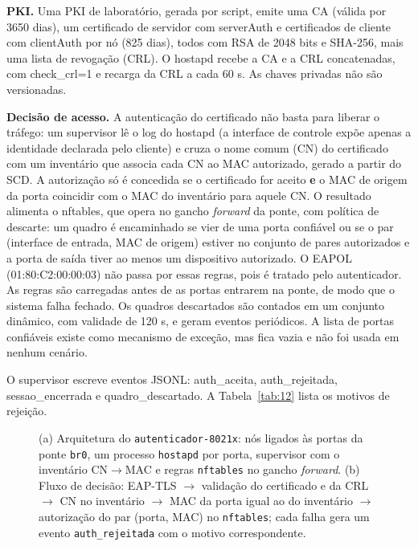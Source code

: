 \documentclass[12pt]{article}
\begin{document}
\textbf{PKI.} Uma PKI de laboratório, gerada por script, emite uma CA (válida por 3650 dias), um certificado de servidor com serverAuth e certificados de cliente com clientAuth por nó (825 dias), todos com RSA de 2048 bits e SHA-256, mais uma lista de revogação (CRL). O hostapd recebe a CA e a CRL concatenadas, com check\_\allowbreak{}crl=1 e recarga da CRL a cada 60 s. As chaves privadas não são versionadas.

\textbf{Decisão de acesso.} A autenticação do certificado não basta para liberar o tráfego: um supervisor lê o log do hostapd (a interface de controle expõe apenas a identidade declarada pelo cliente) e cruza o nome comum (CN) do certificado com um inventário que associa cada CN ao MAC autorizado, gerado a partir do SCD. A autorização só é concedida se o certificado for aceito \textbf{e} o MAC de origem da porta coincidir com o MAC do inventário para aquele CN. O resultado alimenta o nftables, que opera no gancho \emph{forward} da ponte, com política de descarte: um quadro é encaminhado se vier de uma porta confiável ou se o par (interface de entrada, MAC de origem) estiver no conjunto de pares autorizados e a porta de saída tiver ao menos um dispositivo autorizado. O EAPOL (01:80:C2:00:00:03) não passa por essas regras, pois é tratado pelo autenticador. As regras são carregadas antes de as portas entrarem na ponte, de modo que o sistema falha fechado. Os quadros descartados são contados em um conjunto dinâmico, com validade de 120 s, e geram eventos periódicos. A lista de portas confiáveis existe como mecanismo de exceção, mas fica vazia e não foi usada em nenhum cenário.

O supervisor escreve eventos JSONL: auth\_\allowbreak{}aceita, auth\_\allowbreak{}rejeitada, sessao\_\allowbreak{}encerrada e quadro\_\allowbreak{}descartado. A Tabela~\ref{tab:12} lista os motivos de rejeição.

\begin{figure}[!t]
\centering

\caption{(a) Arquitetura do \texttt{autenticador{-}8021x}: nós ligados às portas da ponte \texttt{br0}, um processo \texttt{hostapd} por porta, supervisor com o inventário CN\ensuremath{\rightarrow}MAC e regras \texttt{nftables} no gancho \emph{forward}. (b) Fluxo de decisão: EAP-TLS \ensuremath{\rightarrow} validação do certificado e da CRL \ensuremath{\rightarrow} CN no inventário \ensuremath{\rightarrow} MAC da porta igual ao do inventário \ensuremath{\rightarrow} autorização do par (porta, MAC) no \texttt{nftables}; cada falha gera um evento \texttt{auth\_\allowbreak{}rejeitada} com o motivo correspondente.}\label{fig:6}
\end{figure}
\end{document}
